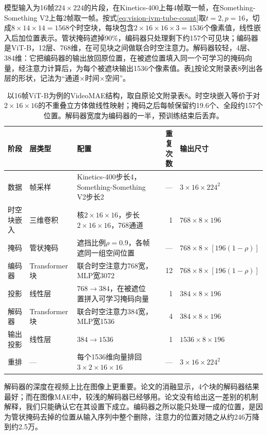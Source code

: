 模型输入为16帧$224\times224$的片段，在Kinetics-400上每4帧取一帧，在Something-Something V2上每2帧取一帧。按式\eqref{eq:vision-ivm-tube-count}取$t=2,p=16$，切成$8\times14\times14=1568$个时空块，每块包含$2\times16\times16\times3=1536$个像素值，线性嵌入后加位置表示。管状掩码遮掉90\%，编码器只处理剩下约157个可见块；编码器是ViT-B，12层、768维，在可见块之间做联合时空注意力。解码器较轻，4层、384维：它把编码器的输出放回原位置，在被遮位置填入同一个可学习的掩码向量，经注意力计算后，为每个被遮块输出1536个像素值。表\ref{tab:vision-ivm-videomae-layers}按论文附录表8列出各层的形状，记法为“通道$\times$时间$\times$空间”。

\begin{table}[tbp]
  \centering
  \small
  \begin{tabularx}{\linewidth}{@{}llXrl@{}}
    \toprule
    阶段 & 层类型 & 配置 & 重复次数 & 输出尺寸\\
    \midrule
    数据 & 帧采样 & Kinetics-400步长4，Something-Something V2步长2 & — & $3\times16\times224^2$\\
    时空块嵌入 & 三维卷积 & 核$2\times16\times16$，步长$2\times16\times16$，768通道 & 1 & $768\times8\times196$\\
    掩码 & 管状掩码 & 遮挡比例$\rho=0.9$，各帧遮同一组空间位置 & — & $768\times8\times[196(1-\rho)]$\\
    编码器 & Transformer块 & 联合时空注意力768宽，MLP宽3072 & 12 & $768\times8\times[196(1-\rho)]$\\
    投影 & 线性层 & $768\to384$，在被遮位置拼入可学习掩码向量 & 1 & $384\times8\times196$\\
    解码器 & Transformer块 & 联合时空注意力384宽，MLP宽1536 & 4 & $384\times8\times196$\\
    输出投影 & 线性层 & $384\to1536$ & 1 & $1536\times8\times196$\\
    重排 & — & 每个1536维向量排回$3\times2\times16\times16$ & — & $3\times16\times224^2$\\
    \bottomrule
  \end{tabularx}
  \caption{以16帧ViT-B为例的VideoMAE结构，取自原论文附录表8。时空块嵌入等价于对$2\times16\times16$的不重叠立方体做线性映射；掩码之后每帧保留约19.6个、全段约157个位置。解码器宽度为编码器的一半，预训练结束后丢弃。}
  \label{tab:vision-ivm-videomae-layers}
\end{table}

解码器的深度在视频上比在图像上更重要。论文的消融显示，4个块的解码器结果最好；而在图像MAE中，较浅的解码器已经够用。论文没有给出这一差别的机制解释，我们只能确认它在其设置下成立。编码器之所以能只处理一成的位置，是因为管状掩码去掉的位置从输入序列中整个删除，注意力的位置对随之从约246万降到约2.5万。

